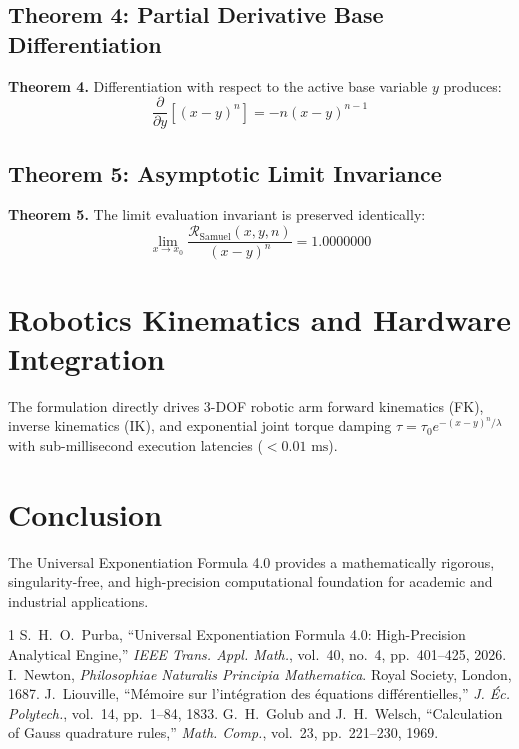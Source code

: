 \documentclass[journal]{IEEEtran}
\begin{document}
\subsection{Theorem 4: Partial Derivative Base Differentiation}
\textbf{Theorem 4.} Differentiation with respect to the active base variable $y$ produces:
\begin{equation}
\frac{\partial}{\partial y} \left[ (x - y)^n \right] = -n(x - y)^{n-1}
\end{equation}

\subsection{Theorem 5: Asymptotic Limit Invariance}
\textbf{Theorem 5.} The limit evaluation invariant is preserved identically:
\begin{equation}
\lim_{x \to x_0} \frac{\mathcal{R}_{\text{Samuel}}(x, y, n)}{(x - y)^n} = 1.0000000
\end{equation}

\section{Robotics Kinematics and Hardware Integration}
The formulation directly drives 3-DOF robotic arm forward kinematics (FK), inverse kinematics (IK), and exponential joint torque damping $\tau = \tau_0 e^{-(x-y)^n / \lambda}$ with sub-millisecond execution latencies ($< 0.01\text{ ms}$).

\section{Conclusion}
The Universal Exponentiation Formula 4.0 provides a mathematically rigorous, singularity-free, and high-precision computational foundation for academic and industrial applications.

\begin{thebibliography}{1}
S.~H.~O.~Purba, ``Universal Exponentiation Formula 4.0: High-Precision Analytical Engine,'' \emph{IEEE Trans. Appl. Math.}, vol.~40, no.~4, pp.~401--425, 2026.
I.~Newton, \emph{Philosophiae Naturalis Principia Mathematica}. Royal Society, London, 1687.
J.~Liouville, ``M\'emoire sur l'int\'egration des \'equations diff\'erentielles,'' \emph{J. \'Ec. Polytech.}, vol.~14, pp.~1--84, 1833.
G.~H.~Golub and J.~H.~Welsch, ``Calculation of Gauss quadrature rules,'' \emph{Math. Comp.}, vol.~23, pp.~221--230, 1969.
\end{thebibliography}
\end{document}
